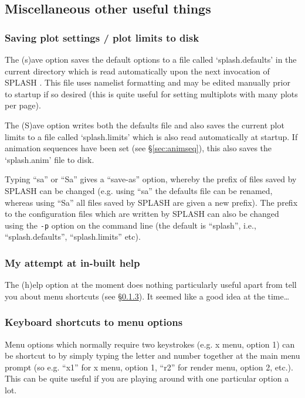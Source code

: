 \documentclass[a4paper,10pt]{article}
\newcommand{\splash}{\textsc{SPLASH }}
\begin{document}
\subsection{Miscellaneous other useful things}

\subsubsection{ Saving plot settings / plot limits to disk}
 The (s)ave option saves the default options to a file called `splash.defaults' in the
current directory which is read automatically upon the next invocation of
\splash. This file uses namelist formatting and may be edited manually prior to  
startup if so desired (this is quite useful for setting multiplots with many plots per
 page).
 
  The (S)ave option writes both the defaults file and also saves the current plot
limits to a file called `splash.limits' which is also read automatically
at startup. If animation sequences have been set (see \S\ref{sec:animseq}), this also saves the `splash.anim' file to disk.

 Typing ``sa'' or ``Sa'' gives a ``save-as'' option, whereby the prefix of files saved by \splash can be changed (e.g. using ``sa'' the defaults file can be renamed, whereas using ``Sa'' all files saved by \splash are given a new prefix). The prefix to the configuration files which are written by \splash can also be changed using the \verb+-p+ option on the command line (the default is ``splash'', i.e., ``splash.defaults'', ``splash.limits'' etc).

\subsubsection{ My attempt at in-built help}
The (h)elp option at the moment does nothing particularly useful apart from tell you about menu shortcuts (see \S\ref{sec:menushortcuts}). It seemed like a good idea at the time\ldots

\subsubsection{ Keyboard shortcuts to menu options}
\label{sec:menushortcuts}
Menu options which normally require two keystrokes (e.g. x menu, option 1) can be shortcut to by simply typing the letter and number together at the main menu prompt (so e.g. ``x1'' for x menu, option 1, ``r2'' for render menu, option 2, etc.). This can be quite useful if you are playing around with one particular option a lot.
\end{document}
